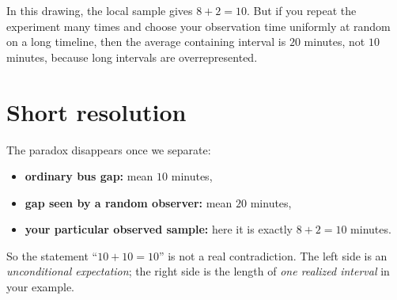 \begin{eg}
\begin{center}
\end{center}

In this drawing, the local sample gives $8+2=10$. But if you repeat the experiment many times and choose your observation time uniformly at random on a long timeline, then the average containing interval is $20$ minutes, not $10$ minutes, because long intervals are overrepresented.

\section*{Short resolution}

The paradox disappears once we separate:

\begin{itemize}[leftmargin=2em]
    \item \textbf{ordinary bus gap:} mean $10$ minutes,
    \item \textbf{gap seen by a random observer:} mean $20$ minutes,
    \item \textbf{your particular observed sample:} here it is exactly $8+2=10$ minutes.
\end{itemize}

So the statement ``$10+10=10$'' is not a real contradiction. The left side is an \emph{unconditional expectation}; the right side is the length of \emph{one realized interval} in your example. 
\end{eg}